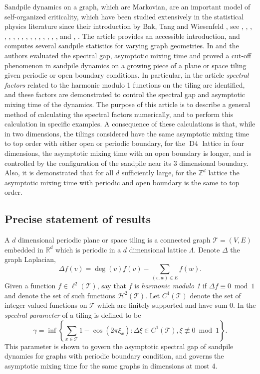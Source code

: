 \documentclass[a4paper, 12pt, notitlepage]{amsart}
\newcommand{\Dfour}{\operatorname{D4}}
\newcommand{\bR}{\mathbb{R}}
\newcommand{\zed}{\mathbb{Z}}
\newcommand{\sH}{\mathscr{H}}
\newcommand{\sT}{\mathscr{T}}
\theoremstyle{remark}
\begin{document}
Sandpile dynamics on a graph, which are Markovian, are an important model of self-organized criticality, which have been studied extensively in the statistical physics literature since their introduction by Bak, Tang and Wiesenfeld \cite{BTW88}, see \cite{D89}, \cite{DM92}, \cite{BIP93}, \cite{P94}, \cite{I94}, \cite{DFF03}, \cite{LH02},  \cite{PR05}, \cite{JPR06}, \cite{SV09}, \cite{LP10}, \cite{DS10}, \cite{FLW10},  \cite{G16}, \cite{KW16}, \cite{NOT17}, and \cite{LPS16}, \cite{PS13}.  The article \cite{KS16} provides an accessible introduction, and computes several sandpile statistics for varying graph geometries.    In \cite{HJL17} and \cite{HS19} the authors evaluated the spectral gap, asymptotic mixing time and proved a cut-off phenomenon in sandpile dynamics on a growing piece of a plane or space tiling given periodic or open boundary conditions.  In particular, in the article \cite{HS19}  \emph{spectral factors} related to the harmonic modulo 1 functions on the tiling are identified, and these factors are demonstrated to control the spectral gap and asymptotic mixing time of the dynamics.  The purpose of this article is to describe a general method of calculating the spectral factors numerically, and to perform this calculation in specific examples.  A consequence of these calculations is that, while in two dimensions, the tilings considered have the same asymptotic mixing time to top order with either open or periodic boundary, for the $\Dfour$ lattice in four dimensions, the asymptotic mixing time with an open boundary is longer, and is controlled by the configuration of the sandpile near its 3 dimensional boundary.  Also, it is demonstrated that for all $d$ sufficiently large, for the $\zed^d$ lattice the asymptotic mixing time with periodic and open boundary is the same to top order. 



 
\subsection{Precise statement of results}
A $d$ dimensional periodic plane or space tiling is a connected graph $\sT =(V,E)$ embedded in $\bR^d$ which is periodic in a $d$ dimensional lattice $\Lambda$. Denote $\Delta$  the graph Laplacian,
\[
 \Delta f(v) = \deg(v) f(v) - \sum_{(v,w) \in E}f(w).
\]
Given a function $f\in \ell^2(\sT)$, say that $f$ is \emph{harmonic modulo 1} if $\Delta f \equiv 0 \bmod 1$ and denote the set of such functions $\sH^2(\sT)$. Let $C^1(\sT)$ denote the set of integer valued functions on $\sT$ which are finitely supported and have sum 0.
In \cite{HS19} the \emph{spectral parameter} of a tiling is defined to be
\begin{equation}
 \gamma = \inf \left\{ \sum_{x \in \sT} 1 - \cos(2\pi \xi_x):\Delta \xi \in C^1(\sT), \xi \not \equiv 0 \bmod 1\right\}.
\end{equation}
This parameter is shown to govern the asymptotic spectral gap of sandpile dynamics for graphs with periodic boundary condition, and governs the asymptotic mixing time for the same graphs in dimensions at most 4. 
\end{document}

